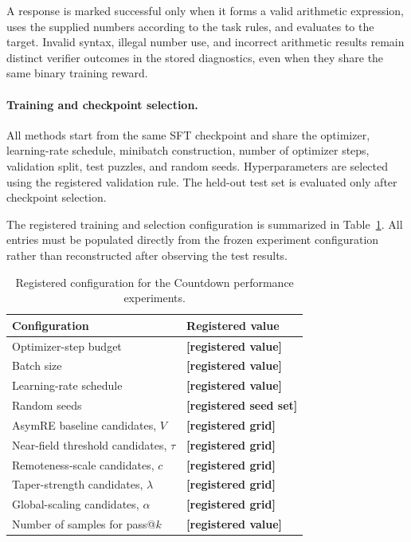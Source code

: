 A response is marked successful only when it forms a valid arithmetic
expression, uses the supplied numbers according to the task rules, and
evaluates to the target. Invalid syntax, illegal number use, and
incorrect arithmetic results remain distinct verifier outcomes in the
stored diagnostics, even when they share the same binary training
reward.

\paragraph{Training and checkpoint selection.}

All methods start from the same SFT checkpoint and share the optimizer,
learning-rate schedule, minibatch construction, number of optimizer
steps, validation split, test puzzles, and random seeds. Hyperparameters
are selected using the registered validation rule. The held-out test set
is evaluated only after checkpoint selection.

The registered training and selection configuration is summarized in
Table~\ref{tab:countdown_registered_config}. All entries must be
populated directly from the frozen experiment configuration rather than
reconstructed after observing the test results.

\begin{table}[t]
\centering
\caption{Registered configuration for the Countdown performance experiments.}
\label{tab:countdown_registered_config}

\small
\setlength{\tabcolsep}{8pt}
\renewcommand{\arraystretch}{1.12}

\begin{tabular}{@{}ll@{}}
\toprule
Configuration & Registered value \\
\midrule
Optimizer-step budget
& \textbf{[registered value]} \\
Batch size
& \textbf{[registered value]} \\
Learning-rate schedule
& \textbf{[registered value]} \\
Random seeds
& \textbf{[registered seed set]} \\
AsymRE baseline candidates, $V$
& \textbf{[registered grid]} \\
Near-field threshold candidates, $\tau$
& \textbf{[registered grid]} \\
Remoteness-scale candidates, $c$
& \textbf{[registered grid]} \\
Taper-strength candidates, $\lambda$
& \textbf{[registered grid]} \\
Global-scaling candidates, $\alpha$
& \textbf{[registered grid]} \\
Number of samples for pass@$k$
& \textbf{[registered value]} \\
\bottomrule
\end{tabular}
\end{table}

